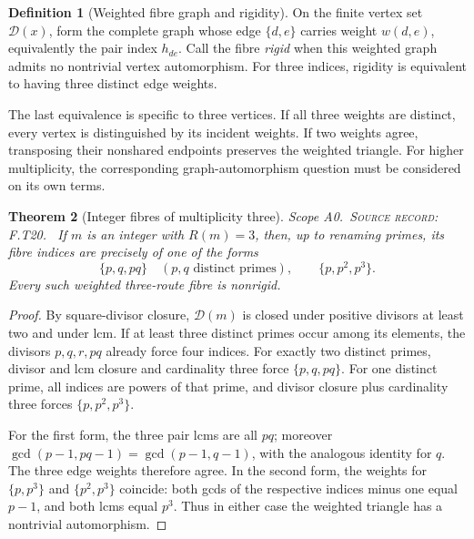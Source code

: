 \documentclass[11pt,oneside,openany]{book}
\newtheorem{theorem}{Theorem}[chapter]
\theoremstyle{definition}
\newtheorem{definition}[theorem]{Definition}
\theoremstyle{remark}
\newcommand{\Dx}{\mathcal{D}}
\newcommand{\gcdop}{\operatorname{gcd}}
\newcommand{\scope}[1]{\textsf{\small Scope #1.}\ }
\newcommand{\record}[1]{\textup{\textsc{Source record: #1.}}\ }
\begin{document}
\begin{definition}[Weighted fibre graph and rigidity]
On the finite vertex set \(\Dx(x)\), form the complete graph whose edge \(\{d,e\}\) carries weight \(w(d,e)\), equivalently the pair index \(h_{de}\). Call the fibre \emph{rigid} when this weighted graph admits no nontrivial vertex automorphism. For three indices, rigidity is equivalent to having three distinct edge weights.
\end{definition}
The last equivalence is specific to three vertices. If all three weights are distinct, every vertex is distinguished by its incident weights. If two weights agree, transposing their nonshared endpoints preserves the weighted triangle. For higher multiplicity, the corresponding graph-automorphism question must be considered on its own terms.

\begin{theorem}[Integer fibres of multiplicity three]\label{thm:int-three}
\scope{A0}\record{F.T20} If \(m\) is an integer with \(R(m)=3\), then, up to renaming primes, its fibre indices are precisely of one of the forms
\[
 \{p,q,pq\}\quad(p,q\text{ distinct primes}),\qquad
 \{p,p^2,p^3\}.
\]
Every such weighted three-route fibre is nonrigid.
\end{theorem}
\begin{proof}
By square-divisor closure, \(\Dx(m)\) is closed under positive divisors at least two and under lcm. If at least three distinct primes occur among its elements, the divisors \(p,q,r,pq\) already force four indices. For exactly two distinct primes, divisor and lcm closure and cardinality three force \(\{p,q,pq\}\). For one distinct prime, all indices are powers of that prime, and divisor closure plus cardinality three forces \(\{p,p^2,p^3\}\).

For the first form, the three pair lcms are all \(pq\); moreover
\(\gcdop(p-1,pq-1)=\gcdop(p-1,q-1)\), with the analogous identity for \(q\). The three edge weights therefore agree. In the second form, the weights for \(\{p,p^3\}\) and \(\{p^2,p^3\}\) coincide: both gcds of the respective indices minus one equal \(p-1\), and both lcms equal \(p^3\). Thus in either case the weighted triangle has a nontrivial automorphism.
\end{proof}
\end{document}
